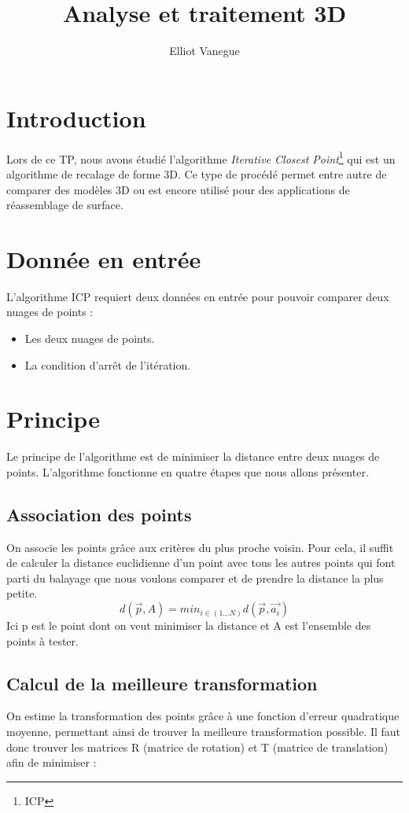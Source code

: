 \documentclass[a4paper,10pt]{article}
\title{Analyse et traitement 3D}
\author{Elliot Vanegue}
\begin{document}
\maketitle

\section{Introduction}
Lors de ce TP, nous avons étudié l'algorithme \textit{Iterative Closest Point}\footnote{ICP} qui est un algorithme de recalage de forme 3D. Ce type de procédé permet entre autre de comparer des modèles 3D ou est encore utilisé pour des applications de réassemblage de surface.

\section{Donnée en entrée}
L'algorithme ICP requiert deux données en entrée pour pouvoir comparer deux nuages de points :
\begin{itemize}
\item Les deux nuages de points.
\item La condition d'arrêt de l'itération.
\end{itemize}

\section{Principe}
Le principe de l'algorithme est de minimiser la distance entre deux nuages de points. L'algorithme fonctionne en quatre étapes que nous allons présenter.

\subsection{Association des points}
On associe les points grâce aux critères du plus proche voisin. Pour cela, il suffit de calculer la distance euclidienne d'un point avec tous les autres points qui font parti du balayage que nous voulons comparer et de prendre la distance la plus petite.
\begin{equation}
d(\vec{p}, A) = min_{i\in{(1...N)}} d(\vec{p},\vec{a_i})
\end{equation}
Ici p est le point dont on veut minimiser la distance et A est l'ensemble des points à tester.

\subsection{Calcul de la meilleure transformation}
On estime la transformation des points grâce à une fonction d'erreur quadratique moyenne, permettant ainsi de trouver la meilleure transformation possible. Il faut donc trouver les matrices R (matrice de rotation) et T (matrice de translation) afin de minimiser :
\end{document}
